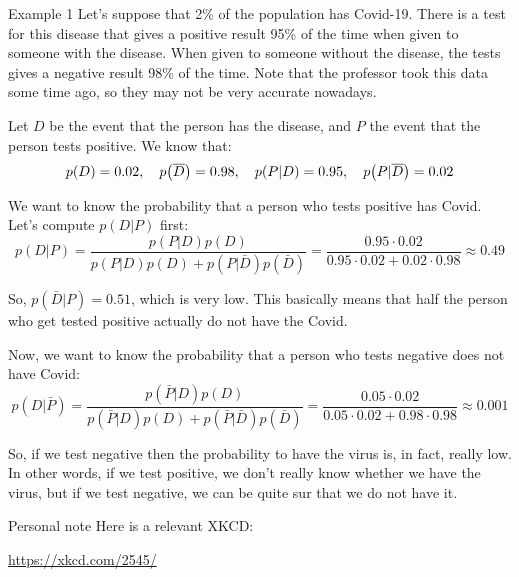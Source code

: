\documentclass[a4paper]{article}
\begin{document}
\begin{parag}{Example 1}
    Let's suppose that 2\% of the population has Covid-19. There is a test for this disease that gives a positive result 95\% of the time when given to someone with the disease. When given to someone without the disease, the tests gives a negative result 98\% of the time. Note that the professor took this data some time ago, so they may not be very accurate nowadays.

    Let $D$ be the event that the person has the disease, and $P$ the event that the person tests positive. We know that: 
    \[p\left(D\right) = 0.02, \mathspace p\left(\bar{D}\right) = 0.98, \mathspace p\left(P|D\right) = 0.95, \mathspace p\left(P | \bar{D}\right) = 0.02\]
    

    We want to know the probability that a person who tests positive has Covid. Let's compute $p\left(D| P\right)$ first:
    \[p\left(D | P\right) = \frac{p\left(P | D\right) p\left(D\right)}{p\left(P|D\right)p\left(D\right) + p\left(P|\bar{D}\right)p\left(\bar{D}\right)} = \frac{0.95\cdot 0.02}{0.95\cdot 0.02 + 0.02\cdot 0.98} \approx 0.49\]
    
    So, $p\left(\bar{D}|P\right) = 0.51$, which is very low. This basically means that half the person who get tested positive actually do not have the Covid.

    Now, we want to know the probability that a person who tests negative does not have Covid: 
    \[p\left(D | \bar{P}\right) = \frac{p\left(\bar{P} | D\right) p\left(D\right)}{p\left(\bar{P}|D\right)p\left(D\right) + p\left(\bar{P}|\bar{D}\right)p\left(\bar{D}\right)} = \frac{0.05 \cdot 0.02}{0.05\cdot 0.02 + 0.98 \cdot 0.98} \approx 0.001\]
    
    So, if we test negative then the probability to have the virus is, in fact, really low. In other words, if we test positive, we don't really know whether we have the virus, but if we test negative, we can be quite sur that we do not have it.

    \begin{subparag}{Personal note}
        Here is a relevant XKCD:

        \begin{center}
            \url{https://xkcd.com/2545/}
        \end{center}
        
    \end{subparag}
    
\end{parag}
\end{document}
